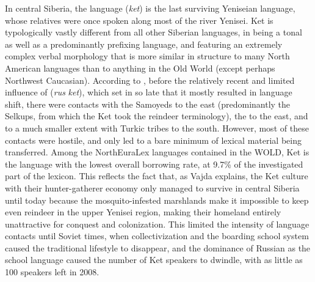 In central Siberia, the  language (\textit{ket}) is the last surviving Yeniseian language, whose relatives were once spoken along most of the river Yenisei. Ket is typologically vastly different from all other Siberian languages, in being a tonal as well as a predominantly prefixing language, and featuring an extremely complex verbal morphology that is more similar in structure to many North American languages than to anything in the Old World (except perhaps Northwest Caucasian). According to \cite{vajda2009}, before the relatively recent and limited influence of  (\textit{rus} \arrowLA \textit{ket}), which set in so late that it mostly resulted in language shift, there were contacts with the Samoyeds to the east (predominantly the Selkups, from which the Ket took the reindeer terminology), the  to the east, and to a much smaller extent with Turkic tribes to the south. However, most of these contacts were hostile, and only led to a bare minimum of lexical material being transferred. Among the NorthEuraLex languages contained in the WOLD, Ket is the language with the lowest overall borrowing rate, at 9.7\% of the investigated part of the lexicon. This reflects the fact that, as Vajda explains, the Ket culture with their hunter-gatherer economy only managed to survive in central Siberia until today because the mosquito-infested marshlands make it impossible to keep even reindeer in the upper Yenisei region, making their homeland entirely unattractive for conquest and colonization. This limited the intensity of language contacts until Soviet times, when collectivization and the boarding school system caused the traditional lifestyle to disappear, and the dominance of Russian as the school language caused the number of Ket speakers to dwindle, with as little as 100 speakers left in 2008.

